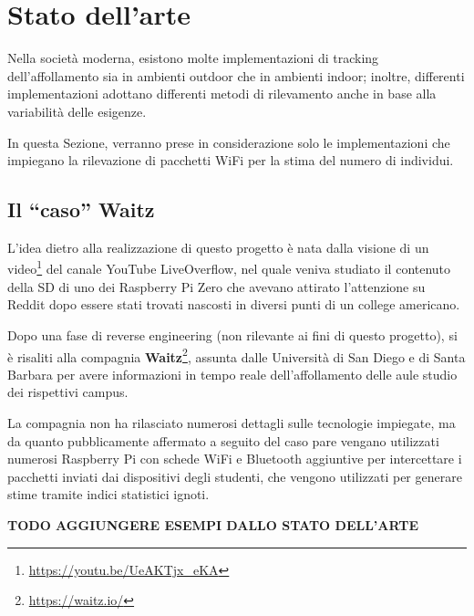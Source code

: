 \section{Stato dell'arte}




Nella società moderna, esistono molte implementazioni di tracking dell'affollamento sia in ambienti outdoor che in ambienti indoor;
inoltre, differenti implementazioni adottano differenti metodi di rilevamento anche in base alla variabilità delle esigenze.

In questa Sezione, verranno prese in considerazione solo le implementazioni che impiegano la rilevazione di pacchetti WiFi per la stima del numero di individui.

\subsection{Il ``caso'' Waitz}

L'idea dietro alla realizzazione di questo progetto è nata dalla visione di un video\footnote{\url{https://youtu.be/UeAKTjx_eKA}} del canale YouTube LiveOverflow,
nel quale veniva studiato il contenuto della SD di uno dei Raspberry Pi Zero che avevano attirato l'attenzione su Reddit dopo essere stati trovati nascosti in diversi punti di un college americano.

Dopo una fase di reverse engineering (non rilevante ai fini di questo progetto), si è risaliti alla compagnia \textbf{Waitz}\footnote{\url{https://waitz.io/}},
assunta dalle Università di San Diego e di Santa Barbara per avere informazioni in tempo reale dell'affollamento delle aule studio dei rispettivi campus.

La compagnia non ha rilasciato numerosi dettagli sulle tecnologie impiegate, ma da quanto pubblicamente affermato a seguito del caso
pare vengano utilizzati numerosi Raspberry Pi con schede WiFi e Bluetooth aggiuntive per intercettare i pacchetti inviati dai dispositivi degli studenti, che vengono utilizzati per generare stime tramite indici statistici ignoti.


\textbf{TODO AGGIUNGERE ESEMPI DALLO STATO DELL'ARTE}
